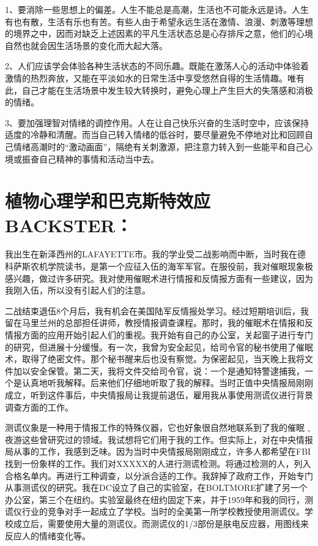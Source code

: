 \documentclass[11pt]{ctexart}
\begin{document}
1、要消除一些思想上的偏差。人生不能总是高潮，生活也不可能永远是诗。人生有也有散，生活有乐也有苦。有些人由于希望永远生活在激情、浪漫、刺激等理想的境界之中，因而对缺乏上述因素的平凡生活状态总是心存排斥之意，他们的心境自然也就会因生活场景的变化而大起大落。

2、人们应该学会体验各种生活状态的不同乐趣。既能在激荡人心的活动中体验着激情的热烈奔放，又能在平淡如水的日常生活中享受悠然自得的生活情趣。唯有此，自己才能在生活场景中发生较大转换时，避免心理上产生巨大的失落感和消极的情绪。

3、要加强理智对情绪的调控作用。人在让自己快乐兴奋的生活时空中，应该保持适度的冷静和清醒。而当自己转入情绪的低谷时，要尽量避免不停地对比和回顾自己情绪高潮时的“激动画面”，隔绝有关刺激源，把注意力转入到一些能平和自己心境或振奋自己精神的事情和活动当中去。
\section{植物心理学和巴克斯特效应BACKSTER：}
\label{sec-96}


我出生在新泽西州的LAFAYETTE市。我的学业受二战影响而中断，当时我在德科萨斯农机学院读书，是第一个应征入伍的海军军官。在服役前，我对催眠现象极感兴趣，做过许多研究。我对使用催眠术进行情报和反情报方面有一些建议，因为我刚入伍，所以没有引起人们的注意。

二战结束退伍8个月后，我有机会在美国陆军反情报处学习。经过短期培训后，我留在马里兰州的总部担任讲师，教授情报调查课程。那时，我的催眠术在情报和反情报方面的应用开始引起人们的重视。我开始有自己的办公室，关起窗子进行专门的研究，但进展十分缓慢。有一次，我曾为安全起见，给司令官的秘书使用了催眠术，取得了绝密文件。那个秘书醒来后也没有察觉。为保密起见，当天晚上我将文件加以安全保管。第二天，我将文件交给司令官，说：一个是通知特警逮捕我，一个是认真地听我解释。后来他们仔细地听取了我的解释。当时正值中央情报局刚刚成立，听到这件事后，中央情报局让我提前退伍，雇用我从事使用测谎仪进行背景调查方面的工作。

测谎仪象是一种用于情报工作的特殊仪器，它也好象很自然地联系到了我的催眠﹑夜游这些曾研究过的领域。我试想将它们用于我的工作。但实际上，对在中央情报局从事的工作，我感到乏味。因为当时中央情报局刚刚成立，许多人都希望在FBI找到一份象样的工作。我们对XXXXX的人进行测谎检测。将通过检测的人，列入合格名单内。再进行工种调查，以分派合适的工作。我辞掉了政府工作，开始专门从事测谎仪的研究。我在DC设立了自己的实验室，在BOLTMORE扩建了另一个办公室，第三个在纽约。实验室最终在纽约固定下来，并于1959年和我的同行，测谎仪行业的竞争对手一起成立了学校。当时的全美第一所学校教授使用测谎仪。学校成立后，需要使用大量的测谎仪。而测谎仪的1/3部份是肤电反应器，用图线来反应人的情绪变化等。
\end{document}
